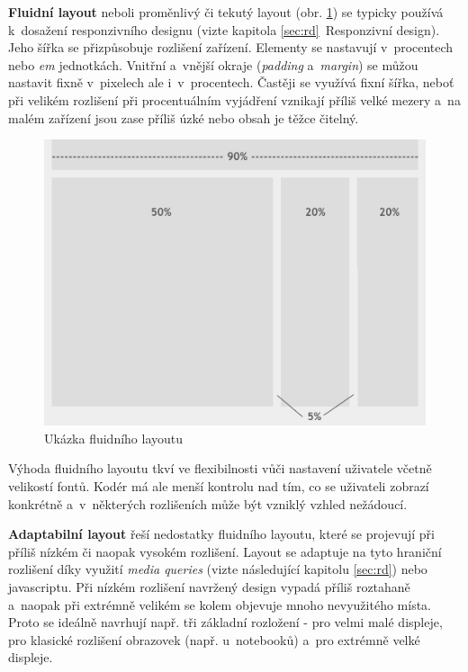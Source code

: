 \documentclass[thesis=B,czech]{FITthesis}[2012/06/26]
\begin{document}

\textbf{Fluidní layout} neboli proměnlivý či tekutý layout (obr. \ref{imgFluid}) se typicky používá k~dosažení responzivního designu (vizte kapitola \ref{sec:rd}~Responzivní design). Jeho šířka se přizpůsobuje rozlišení zařízení. Elementy se nastavují v~procentech nebo \textit{em} jednotkách. Vnitřní a~vnější okraje (\textit{padding} a~\textit{margin}) se můžou nastavit fixně v~pixelech ale i~v~procentech. Častěji se využívá fixní šířka, neboť při velikém rozlišení při procentuálním vyjádření vznikají příliš velké mezery a~na malém zařízení jsou zase příliš úzké nebo obsah je těžce čitelný\cite{fix}.

\begin{figure}[h]
	\begin{center}
	\includegraphics[scale=0.5]{images/image21.jpg}
	\end{center}
	\caption{Ukázka fluidního layoutu \cite{fix}}
	\label{imgFluid}
\end{figure}

Výhoda fluidního layoutu tkví ve flexibilnosti vůči nastavení uživatele včetně velikostí fontů. Kodér má ale menší kontrolu nad tím, co se uživateli zobrazí konkrétně a~v~některých rozlišeních může být vzniklý vzhled nežádoucí.

\textbf{Adaptabilní layout} řeší nedostatky fluidního layoutu, které se projevují při příliš nízkém či naopak vysokém rozlišení. Layout se adaptuje na tyto hraniční rozlišení díky využití \textit{media queries} (vizte následující kapitolu \ref{sec:rd}) nebo javascriptu. Při nízkém rozlišení navržený design vypadá příliš roztahaně a~naopak při extrémně velikém se kolem objevuje mnoho nevyužitého místa. Proto se ideálně navrhují např. tři základní rozložení - pro velmi malé displeje, pro klasické rozlišení obrazovek (např. u~notebooků) a~pro extrémně velké displeje\cite{adapt}.
\end{document}
